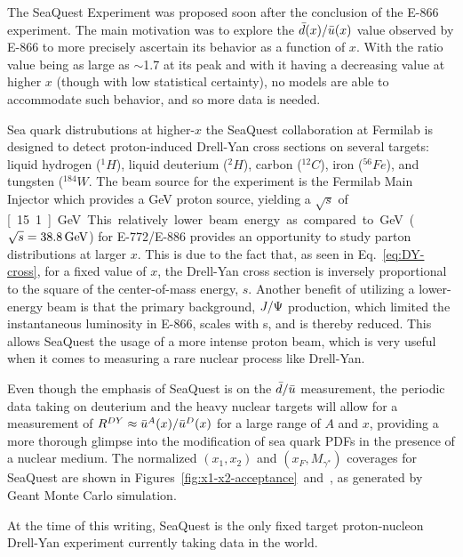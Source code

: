 The SeaQuest Experiment was proposed soon after the conclusion of the E-866 experiment. The main motivation was to explore the $\bar{d}(x)/\bar{u}(x)$ value observed by E-866 to more precisely ascertain its behavior as a function of $x$. With the ratio value being as large as $\sim$1.7 at its peak and with it having a decreasing value at higher $x$ (though with low statistical certainty), no models are able to accommodate such behavior, and so more data is needed. 

Sea quark distrubutions at higher-$x$ the SeaQuest collaboration at Fermilab is designed to detect proton-induced Drell-Yan cross sections on several targets: liquid hydrogen ($^1H$), liquid deuterium ($^2H$), carbon ($^{12}C$), iron ($^{56}Fe$), and tungsten ($^{184}W$. The beam source for the experiment is the Fermilab Main Injector which provides a \unit[120]{GeV} proton source, yielding a $\sqrt{s}$ of \unit[15.1]{GeV}. This relatively lower beam energy as compared to \unit[800]{GeV} ($\sqrt{s}=\unit[38.8]{GeV}$) for E-772/E-886 provides an opportunity to study parton distributions at larger $x$. This is due to the fact that, as seen in Eq.~\ref{eq:DY-cross}, for a fixed value of $x$, the Drell-Yan cross section is inversely proportional to the square of the center-of-mass energy, $s$. Another benefit of utilizing a lower-energy beam is that the primary background, $J/\Psi$ production, which limited the instantaneous luminosity in E-866, scales with s, and is thereby reduced. This allows SeaQuest the usage of a more intense proton beam, which is very useful when it comes to measuring a rare nuclear process like Drell-Yan.

Even though the emphasis of SeaQuest is on the $\bar{d}/\bar{u}$ measurement, the periodic data taking on deuterium and the heavy nuclear targets will allow for a measurement of $R^{DY}\approx\bar{u}^A(x)/\bar{u}^D(x)$ for a large range of $A$ and $x$, providing a more thorough glimpse into the modification of sea quark PDFs in the presence of a nuclear medium. The normalized $(x_1, x_2)$ and $(x_F, M_{\gamma^*})$ coverages for SeaQuest are shown in Figures~\ref{fig:x1-x2-acceptance}~and~, as generated by Geant Monte Carlo simulation.

At the time of this writing, SeaQuest is the only fixed target proton-nucleon Drell-Yan experiment currently taking data in the world.

